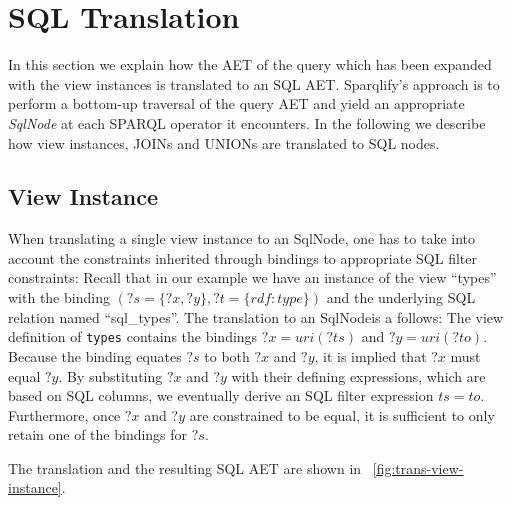 \documentclass[a4paper,twoside,bibtotoc,abstracton,12pt,BCOR=15mm]{scrreprt}
\begin{document}


\section{SQL Translation}
In this section we explain how the AET of the query which has been expanded with the view instances is translated to an SQL AET.
Sparqlify's approach is to perform a bottom-up traversal of the query AET and yield an appropriate \emph{SqlNode} at each SPARQL operator it encounters.
In the following we describe how view instances, JOINs and UNIONs are translated to SQL nodes.


\subsection{View Instance}
When translating a single view instance to an SqlNode, one has to take into account the constraints
inherited through bindings to appropriate SQL filter constraints:
Recall that in our example we have an instance of the view ``types'' with the binding $(?s = \{?x, ?y\}, ?t = \{rdf:type\})$
and the underlying SQL relation named ``sql\_types''.
The translation to an SqlNodeis a follows:
The view definition of \texttt{types} contains the bindings $?x = uri(?ts)$ and $?y = uri(?to)$.
Because the binding equates $?s$ to both $?x$ and $?y$, it is implied that $?x$ must equal $?y$. 
By substituting $?x$ and $?y$ with their defining expressions, which are based on SQL columns, we eventually derive an SQL filter expression $ts = to$.
Furthermore, once $?x$ and $?y$ are constrained to be equal, it is sufficient to only retain one of the bindings for $?s$.

The translation and the resulting SQL AET are shown in ~\autoref{fig:trans-view-instance}. 
\end{document}
